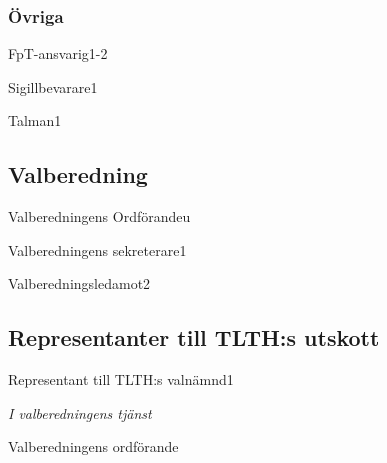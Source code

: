 \documentclass[10pt]{article}
\begin{document}
\subsubsection{Övriga}
\begin{vallista}
    \begin{post}{FpT-ansvarig}{1-2}
    \end{post}
    \begin{post}{Sigillbevarare}{1}
    \end{post}
    \begin{post}{Talman}{1}
    \end{post}
\end{vallista}

\subsection{Valberedning}
\begin{vallista}
    \begin{post}{Valberedningens Ordförande}{u}
        \vakant
    \end{post}
    \begin{post}{Valberedningens sekreterare}{1}
        \vakant
    \end{post}
    \begin{post}{Valberedningsledamot}{2}
    \end{post}
\end{vallista}

\subsection{Representanter till TLTH:s utskott}
\begin{vallista}
    \begin{post}{Representant till TLTH:s valnämnd}{1}
        \vakant
    \end{post}
\end{vallista}

\begin{signatures}{1}
\emph{I valberedningens tjänst}
\signature{Elin Magnusson}{Valberedningens ordförande}
\end{signatures}
\end{document}
